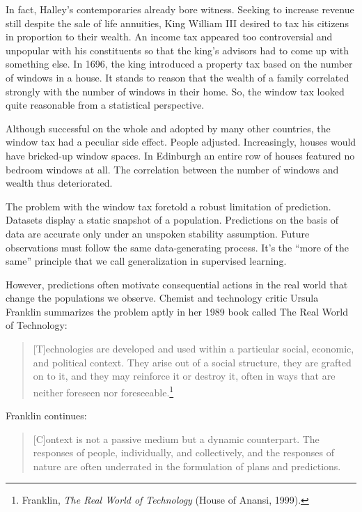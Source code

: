 \documentclass{tufte-book}
\begin{document}
In fact, Halley's contemporaries already bore witness. Seeking to
increase revenue still despite the sale of life annuities, King William
III desired to tax his citizens in proportion to their wealth. An income
tax appeared too controversial and unpopular with his constituents so
that the king's advisors had to come up with something else. In 1696,
the king introduced a property tax based on the number of windows in a
house. It stands to reason that the wealth of a family correlated
strongly with the number of windows in their home. So, the window tax
looked quite reasonable from a statistical perspective.

Although successful on the whole and adopted by many other countries,
the window tax had a peculiar side effect. People adjusted.
Increasingly, houses would have bricked-up window spaces. In Edinburgh
an entire row of houses featured no bedroom windows at all. The
correlation between the number of windows and wealth thus deteriorated.

The problem with the window tax foretold a robust limitation of
prediction. Datasets display a static snapshot of a population.
Predictions on the basis of data are accurate only under an unspoken
stability assumption. Future observations must follow the same
data-generating process. It's the ``more of the same'' principle that we
call generalization in supervised learning.

However, predictions often motivate consequential actions in the real
world that change the populations we observe. Chemist and technology
critic Ursula Franklin summarizes the problem aptly in her 1989 book
called The Real World of Technology:

\begin{quote}
{[}T{]}echnologies are developed and used within a particular social,
economic, and political context. They arise out of a social structure,
they are grafted on to it, and they may reinforce it or destroy it,
often in ways that are neither foreseen nor foreseeable.\footnote{Franklin,
  \emph{The Real World of Technology} (House of Anansi, 1999).}
\end{quote}

Franklin continues:

\begin{quote}
{[}C{]}ontext is not a passive medium but a dynamic counterpart. The
responses of people, individually, and collectively, and the responses
of nature are often underrated in the formulation of plans and
predictions.
\end{quote}
\end{document}
